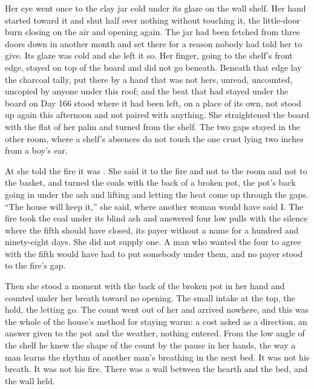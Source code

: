 Her eye went once to the clay jar cold under its glaze on the wall shelf. Her hand started toward it and shut half over nothing without touching it, the little-door burn closing on the air and opening again. The jar had been fetched from three doors down in another month and set there for a reason nobody had told her to give. Its glaze was cold and she left it so. Her finger, going to the shelf's front edge, stayed on top of the board and did not go beneath. Beneath that edge lay the charcoal tally, put there by a hand that was not hers, unread, uncounted, uncopied by anyone under this roof; and the beat that had stayed under the board on Day 166 stood where it had been left, on a place of its own, not stood up again this afternoon and not paired with anything. She straightened the board with the flat of her palm and turned from the shelf. The two gaps stayed in the other room, where a shelf's absences do not touch the one crust lying two inches from a boy's ear.

\scenebreak

At  she told the fire it was . She said it to the fire and not to the room and not to the basket, and turned the coals with the back of a broken pot, the pot's back going in under the ash and lifting and letting the heat come up through the gaps. “The house will keep it,” she said, where another woman would have said I. The fire took the coal under its blind ash and answered four low pulls with the silence where the fifth should have closed, its payer without a name for a hundred and ninety-eight days. She did not supply one. A man who wanted the four to agree with the fifth would have had to put somebody under them, and no payer stood to the fire's gap.

Then she stood a moment with the back of the broken pot in her hand and counted under her breath toward no opening. The small intake at the top, the hold, the letting go. The count went out of her and arrived nowhere, and this was the whole of the house's method for staying warm: a cost asked as a direction, an answer given to the pot and the weather, nothing entered. From the low angle of the shelf he knew the shape of the count by the pause in her hands, the way a man learns the rhythm of another man's breathing in the next bed. It was not his breath. It was not his fire. There was a wall between the hearth and the bed, and the wall held.

